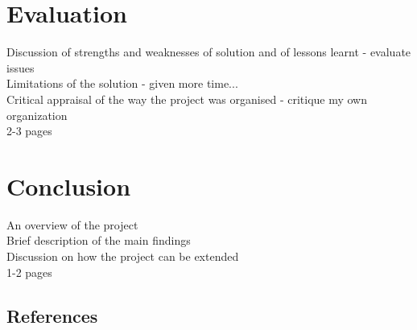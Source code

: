 \documentclass[12pt,a4paper]{article}
\begin{document}
\section{Evaluation}

Discussion of strengths and weaknesses of solution and of lessons learnt - evaluate issues\\
Limitations of the solution - given more time...\\
Critical appraisal of the way the project was organised - critique my own organization\\
2-3 pages

\section{Conclusion}

An overview of the project\\
Brief description of the main findings\\
Discussion on how the project can be extended\\
1-2 pages

\subsection{References} 



\nocite{*}
\end{document}
